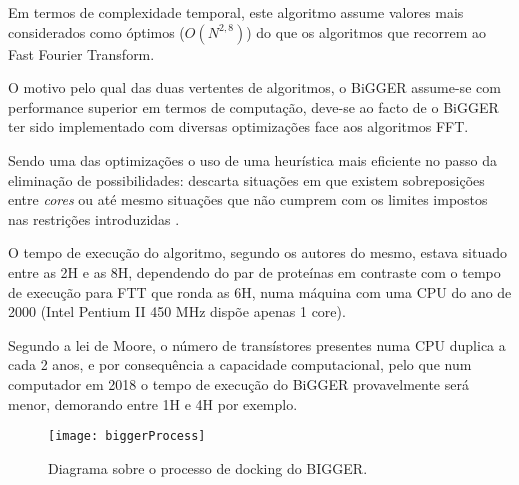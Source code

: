 Em termos de complexidade temporal, este algoritmo assume valores mais considerados como óptimos ($O(N^{2,8})$) do que os algoritmos que recorrem ao Fast Fourier Transform. 

O motivo pelo qual das duas vertentes de algoritmos, o BiGGER assume-se com performance superior em termos de computação, deve-se ao facto de o BiGGER ter sido implementado com diversas optimizações face aos algoritmos FFT. 

Sendo uma das optimizações o uso de uma heurística mais eficiente no passo da eliminação de possibilidades: descarta situações em que existem sobreposições entre \textit{cores} ou até mesmo situações que não cumprem com os limites impostos nas restrições introduzidas . 

O tempo de execução do algoritmo, segundo os autores do mesmo, estava situado entre as 2H e as 8H, dependendo do par de proteínas em contraste com o tempo de execução para FTT que ronda as 6H, numa máquina com uma CPU do ano de 2000 (Intel Pentium II 450 MHz dispõe apenas 1 core). 

Segundo a lei de Moore, o número de transístores presentes numa CPU duplica a cada 2 anos, e por consequência a capacidade computacional, pelo que num computador em 2018 o tempo de execução do BiGGER provavelmente será menor, demorando entre 1H e 4H por exemplo.
  \begin{figure}[ht]
  \centering
    {\texttt{[image: biggerProcess]}}
  \caption{Diagrama sobre o processo de docking do BIGGER\cite{almeida2016predicting}.}
  \label{biggerProcess}
\end{figure}
